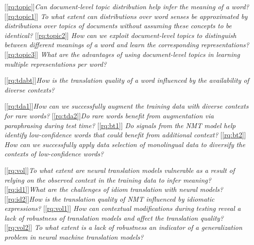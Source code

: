 [\ref{rq:topic}]{\textit{Can document-level topic distribution help infer the meaning of a word?}}
[\ref{rq:topic1}]{\textit{ To what extent can distributions over word senses be approximated by distributions over topics of documents without assuming these concepts to be identical?}}  %
[\ref{rq:topic2}]{\textit{ How can we exploit document-level topics to distinguish between different meanings of a word and learn the corresponding representations?}}%
[\ref{rq:topic3}]{\textit{ What are the advantages of using document-level topics in learning multiple representations per word? }}%

[\ref{rq:tdabt}]{\textit{How is the translation quality of a word influenced by the availability of diverse contexts?}}

[\ref{rq:tda1}]{\textit{How can we successfully augment the training data with diverse contexts for rare words?}}%
[\ref{rq:tda2}]{\textit{Do rare words benefit from augmentation via paraphrasing during test time?}}%
[\ref{rq:bt1}]{\textit{ Do signals from the NMT model help identify low-confidence words that could benefit from additional context?  }}%
[\ref{rq:bt2}]{\textit{ How can we successfully apply data selection of monolingual data to diversify the contexts of low-confidence words? }}%

[\ref{rq:vol}]{\textit{To what extent are neural translation models vulnerable as a result of relying on the observed context in the training data to infer meaning? }}
[\ref{rq:id1}]{\textit{What are the challenges of idiom translation with neural models? }} %
[\ref{rq:id2}]{\textit{How is the translation quality of NMT influenced by idiomatic expressions? }} %
[\ref{rq:vol1}]{\textit{ How can contextual modifications during testing reveal a lack of robustness of translation models and affect the translation quality?}}%
[\ref{rq:vol2}]{\textit{ To what extent is a lack of robustness an indicator of a generalization problem in neural machine translation models?  }}%


